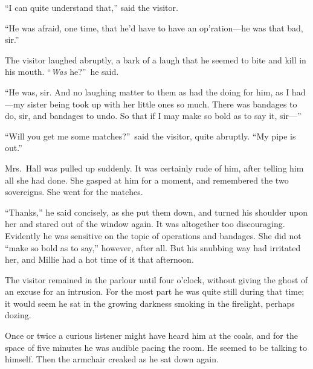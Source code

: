 “I can quite understand that,” said the visitor.

“He was afraid, one time, that he’d have to have an op’ration—he was that bad, sir.”

The visitor laughed abruptly, a bark of a laugh that he seemed to bite and kill in his mouth. “\emph{Was} he?”\ he said.

“He was, sir. And no laughing matter to them as had the doing for him, as I had—my sister being took up with her little ones so much. There was bandages to do, sir, and bandages to undo. So that if I may make so bold as to say it, sir—”

“Will you get me some matches?”\ said the visitor, quite abruptly. “My pipe is out.”

Mrs.\ Hall was pulled up suddenly. It was certainly rude of him, after telling him all she had done. She gasped at him for a moment, and remembered the two sovereigns. She went for the matches.

“Thanks,” he said concisely, as she put them down, and turned his shoulder upon her and stared out of the window again. It was altogether too discouraging. Evidently he was sensitive on the topic of operations and bandages. She did not “make so bold as to say,” however, after all. But his snubbing way had irritated her, and Millie had a hot time of it that afternoon.

The visitor remained in the parlour until four o’clock, without giving the ghost of an excuse for an intrusion. For the most part he was quite still during that time; it would seem he sat in the growing darkness smoking in the firelight, perhaps dozing.

Once or twice a curious listener might have heard him at the coals, and for the space of five minutes he was audible pacing the room. He seemed to be talking to himself. Then the armchair creaked as he sat down again.
\clearpage
